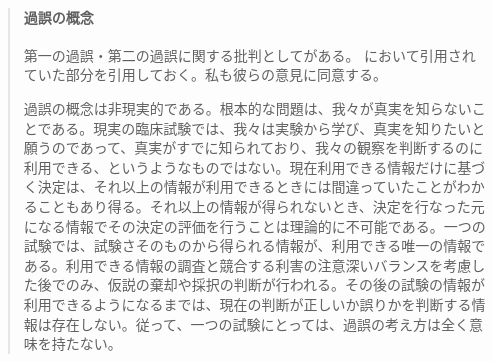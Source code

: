 \begin{mybox}
    \begin{quote}
    \paragraph{過誤の概念}
    第一の過誤・第二の過誤に関する批判として\cite{norleans2004臨床試験のための統計的方法}がある。
    \cite{2010毒性試験に用いる統計解析法の動向}において引用されていた部分を引用しておく。私も彼らの意見に同意する。


    過誤の概念は非現実的である。根本的な問題は、我々が真実を知らないことである。現実の臨床試験では、我々は実験から学び、真実を知りたいと願うのであって、真実がすでに知られており、我々の観察を判断するのに利用できる、というようなものではない。現在利用できる情報だけに基づく決定は、それ以上の情報が利用できるときには間違っていたことがわかることもあり得る。それ以上の情報が得られないとき、決定を行なった元になる情報でその決定の評価を行うことは理論的に不可能である。一つの試験では、試験さそのものから得られる情報が、利用できる唯一の情報である。利用できる情報の調査と競合する利害の注意深いバランスを考慮した後でのみ、仮説の棄却や採択の判断が行われる。その後の試験の情報が利用できるようになるまでは、現在の判断が正しいか誤りかを判断する情報は存在しない。従って、一つの試験にとっては、過誤の考え方は全く意味を持たない。
    \end{quote}
\end{mybox}

